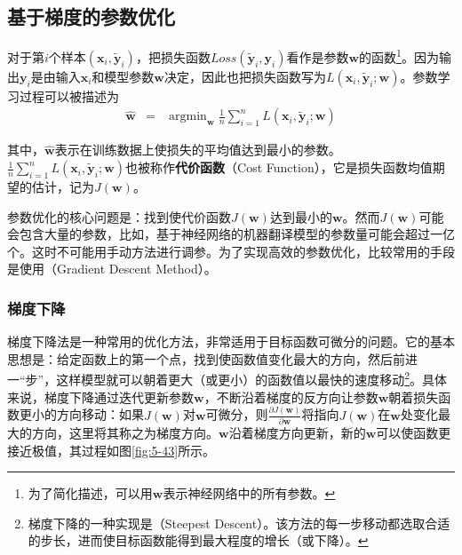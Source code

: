 
\subsection{基于梯度的参数优化}\label{sec5:para-training}

\parinterval 对于第$ i $个样本$ (\mathbf x_i,\mathbf {\widetilde y}_i) $，把损失函数$ Loss(\mathbf {\widetilde y}_i,\mathbf y_i) $看作是参数$ \mathbf w $的函数\footnote{为了简化描述，可以用$ \mathbf w $表示神经网络中的所有参数。}。因为输出$ \mathbf y_i $是由输入$ \mathbf x_i $和模型参数$ \mathbf w $决定，因此也把损失函数写为$ L(\mathbf x_i,\mathbf {\widetilde y}_i;\mathbf w) $。参数学习过程可以被描述为
\begin{eqnarray}
\widehat{\mathbf w}&=&\mathop{\arg\min}_{\mathbf w}\frac{1}{n}\sum_{i=1}^{n}{L(\mathbf x_i,\mathbf {\widetilde y}_i;\mathbf w)}
\label{eq:5-28}
\end{eqnarray}

\noindent 其中，$ \widehat{\mathbf w} $表示在训练数据上使损失的平均值达到最小的参数。$ \frac{1}{n}\sum_{i=1}^{n}{L(\mathbf x_i,\mathbf {\widetilde y}_i;\mathbf w)} $也被称作{\small\sffamily\bfseries{代价函数}}（Cost Function），它是损失函数均值期望的估计，记为$ J(\mathbf w) $。

\parinterval 参数优化的核心问题是：找到使代价函数$ J(\mathbf w) $达到最小的$ \mathbf w $。然而$ J(\mathbf w) $可能会包含大量的参数，比如，基于神经网络的机器翻译模型的参数量可能会超过一亿个。这时不可能用手动方法进行调参。为了实现高效的参数优化，比较常用的手段是使用{\small{}}（Gradient Descent Method）。


\subsubsection{梯度下降}

\parinterval 梯度下降法是一种常用的优化方法，非常适用于目标函数可微分的问题。它的基本思想是：给定函数上的第一个点，找到使函数值变化最大的方向，然后前进一``步''，这样模型就可以朝着更大（或更小）的函数值以最快的速度移动\footnote{梯度下降的一种实现是{\scriptsize{}}（Steepest Descent）。该方法的每一步移动都选取合适的步长，进而使目标函数能得到最大程度的增长（或下降）。}。具体来说，梯度下降通过迭代更新参数$ \mathbf w $，不断沿着梯度的反方向让参数$ \mathbf w $朝着损失函数更小的方向移动：如果$ J(\mathbf w) $对$ \mathbf w $可微分，则$ \frac{\partial J(\mathbf w)}{\partial \mathbf w} $将指向$ J(\mathbf w) $在$ \mathbf w $处变化最大的方向，这里将其称之为梯度方向。$ \mathbf w $沿着梯度方向更新，新的$ \mathbf w $可以使函数更接近极值，其过程如图\ref{fig:5-43}所示。

